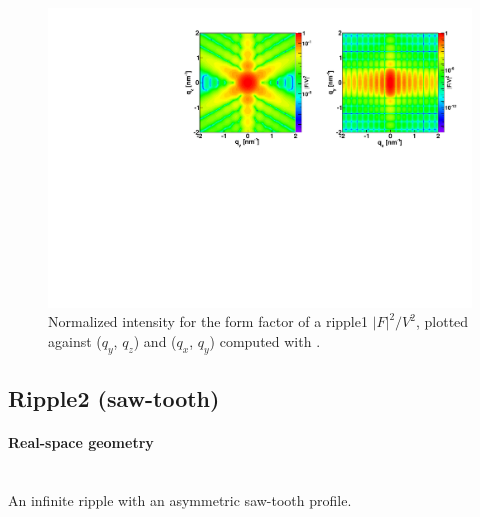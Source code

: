 \begin{figure}[h]
\begin{center}
\includegraphics[angle=-90,width=\textwidth]{fig/ff/figffripple1.pdf}
\end{center}
\caption{Normalized intensity for the form factor of a ripple1
  $|F|^2/V^2$, plotted against ($q_y$, $q_z$) and  ($q_x$, $q_y$)
  computed with .}
\label{fig:FFripple1Ex}
\end{figure}


\clearpage
\subsection{Ripple2 (saw-tooth)} \label{sec:Ripple2}  

\paragraph{Real-space geometry}\strut\\
An infinite ripple with an asymmetric saw-tooth profile.

